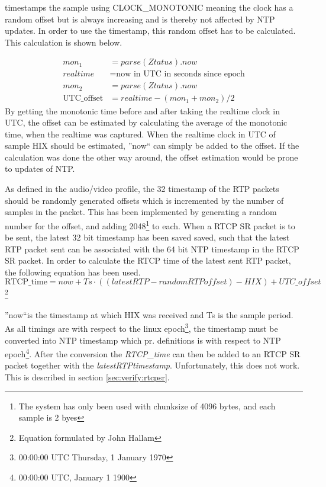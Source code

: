  timestamps the sample using CLOCK\_MONOTONIC meaning the clock has a random offset but is always increasing and is thereby not affected by \ac{NTP} updates. In order to use the timestamp, this random offset has to be calculated. This calculation is shown below.

\begin{align}
	mon_1 &= parse(Ztatus).now \\
	realtime &= \text{now in UTC in seconds since epoch} \\
	mon_2 &= parse(Ztatus).now \\
	\text{UTC\_offset} &= realtime-(mon_1+mon_2)/2 
\end{align}
By getting the monotonic time before and after taking the realtime clock in UTC, the offset can be estimated by calculating the average of the monotonic time, when the realtime was captured. When the realtime clock in UTC of sample HIX should be estimated, ''now`` can simply be added to the offset.  If the calculation was done the other way around, the offset estimation would be prone to updates of NTP.

As defined in the audio/video profile, the 32 timestamp of the RTP packets should be randomly generated offsets which is incremented by the number of samples in the packet. This has been implemented by generating a random number for the offset, and adding 2048\footnote{The system has only been used with chunksize of 4096 bytes, and each sample is 2 byes} to each. When a RTCP SR packet is to be sent, the latest 32 bit timestamp has been saved saved, such that the latest RTP packet sent can be associated with the 64 bit NTP timestamp in the RTCP SR packet. In order to calculate the RTCP time of the latest sent RTP packet, the following equation has been used.
\begin{equation}
	\text{RTCP\_time} = now + Ts\cdot((latestRTP-\textit{randomRTPoffset})-HIX)+\textit{UTC\_offset}
\end{equation} \footnote{Equation formulated by John Hallam}

''now``is the timestamp at which HIX was received and Ts is the sample period.
As all timings are with respect to the linux epoch\footnote{00:00:00 UTC Thursday, 1 January 1970}, the timestamp must be converted into NTP timestamp  which pr. definitions is with respect to NTP epoch\footnote{00:00:00 UTC, January 1 1900}. After the conversion the \textit{RTCP\_time} can then be added to an RTCP SR packet together with the \textit{latestRTPtimestamp}. 
Unfortunately, this does not work. This is described in section \ref{sec:verify:rtcpsr}.

